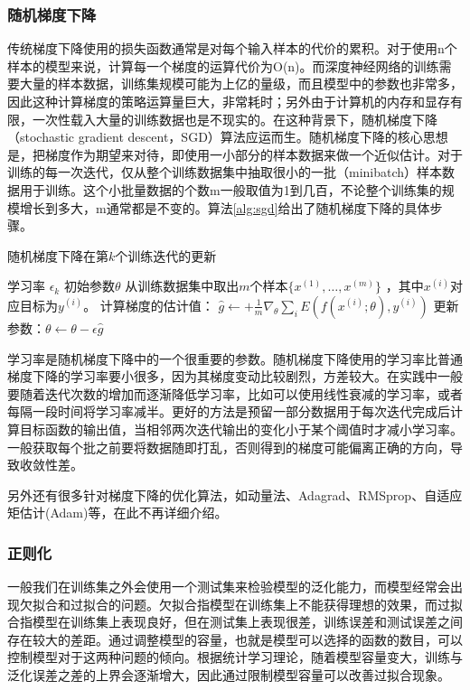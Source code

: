 \subsubsection{随机梯度下降}
传统梯度下降使用的损失函数通常是对每个输入样本的代价的累积。对于使用n个样本的模型来说，计算每一个梯度的运算代价为O(n)。而深度神经网络的训练需要大量的样本数据，训练集规模可能为上亿的量级，而且模型中的参数也非常多，因此这种计算梯度的策略运算量巨大，非常耗时；另外由于计算机的内存和显存有限，一次性载入大量的训练数据也是不现实的。在这种背景下，随机梯度下降（stochastic gradient descent，SGD）算法应运而生。随机梯度下降的核心思想是，把梯度作为期望来对待，即使用一小部分的样本数据来做一个近似估计。对于训练的每一次迭代，仅从整个训练数据集中抽取很小的一批（minibatch）样本数据用于训练。这个小批量数据的个数m一般取值为1到几百，不论整个训练集的规模增长到多大，m通常都是不变的。算法\ref{alg:sgd}给出了随机梯度下降的具体步骤。
\begin{algorithm}[htb]
	\caption{随机梯度下降在第$k$个训练迭代的更新}
	\label{alg:sgd}
	\begin{algorithmic}
		\REQUIRE 学习率 $\epsilon_k$
		\REQUIRE 初始参数$\theta$
		\STATE 从训练数据集中取出$m$个样本$\{ x^{(1)},\dots, x^{(m)}\}$ ，其中$x^{(i)}$对应目标为$y^{(i)}$。
		\STATE 计算梯度的估计值： $\hat{g} \leftarrow + 
		\frac{1}{m} \nabla_{\theta} \sum_i E(f(x^{(i)};\theta),y^{(i)})$
		\STATE 更新参数：$\theta \leftarrow \theta - \epsilon \hat{g}$
		\ENDWHILE
	\end{algorithmic}
\end{algorithm}

学习率是随机梯度下降中的一个很重要的参数。随机梯度下降使用的学习率比普通梯度下降的学习率要小很多，因为其梯度变动比较剧烈，方差较大。在实践中一般要随着迭代次数的增加而逐渐降低学习率，比如可以使用线性衰减的学习率，或者每隔一段时间将学习率减半。更好的方法是预留一部分数据用于每次迭代完成后计算目标函数的输出值，当相邻两次迭代输出的变化小于某个阈值时才减小学习率。一般获取每个批之前要将数据随即打乱，否则得到的梯度可能偏离正确的方向，导致收敛性差。

另外还有很多针对梯度下降的优化算法，如动量法、Adagrad、RMSprop、自适应矩估计(Adam)等，在此不再详细介绍。

\subsubsection{正则化}
一般我们在训练集之外会使用一个测试集来检验模型的泛化能力，而模型经常会出现欠拟合和过拟合的问题。欠拟合指模型在训练集上不能获得理想的效果，而过拟合指模型在训练集上表现良好，但在测试集上表现很差，训练误差和测试误差之间存在较大的差距。通过调整模型的容量，也就是模型可以选择的函数的数目，可以控制模型对于这两种问题的倾向。根据统计学习理论，随着模型容量变大，训练与泛化误差之差的上界会逐渐增大，因此通过限制模型容量可以改善过拟合现象。

